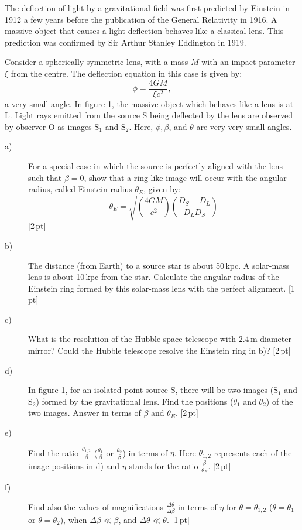 
The deflection of light by a gravitational field was first predicted by
Einstein in 1912 a few years before the publication of the General Relativity
in 1916. A massive object that causes a light deflection behaves like a
classical lens. This prediction was confirmed by Sir Arthur Stanley Eddington
in 1919.


Consider a spherically symmetric lens, with a mass $M$ with an impact
parameter $\xi$ from the centre. The deflection equation in this case is given
by:
\[ \phi = \frac{4GM}{\xi c^2}, \]
a very small angle. In figure 1, the massive object which behaves like a lens
is at L. Light rays emitted from the source S being deflected by the lens are
observed by observer O as images $\mathrm{S}_1$ and $\mathrm{S}_2$. Here,
$\phi, \beta$, and $\theta$ are very very small angles.

\begin{description}
\item[a)] For a special case in which the source is perfectly aligned with the
  lens such that $\beta = 0$, show that a ring-like image will occur with the
  angular radius, called Einstein radius $\theta_E$, given by:
  \[ \theta_E = \sqrt{\left(\frac{4GM}{c^2}\right)
     \left(\frac{D_S - D_L}{D_L D_S}\right)} \]
  \hfill[2\,pt]
\item[b)] The distance (from Earth) to a source star is about 50\,kpc. A
  solar-mass lens is about 10\,kpc from the star. Calculate the angular radius
  of the Einstein ring formed by this solar-mass lens with the perfect
  alignment. \hfill[1\,pt]
\item[c)] What is the resolution of the Hubble space telescope with 2.4\,m
  diameter mirror? Could the Hubble telescope resolve the Einstein ring in
  b)? \hfill[2\,pt]
\item[d)] In figure 1, for an isolated point source S, there will be two
  images ($\mathrm{S}_1$ and $\mathrm{S}_2$) formed by the gravitational
  lens. Find the positions ($\theta_1$ and $\theta_2$) of the two images.
  Answer in terms of $\beta$ and $\theta_E$. \hfill[2\,pt]
\item[e)] Find the ratio $\frac{\theta_{1,2}}{\beta}$ ($\frac{\theta_1}{\beta}$
  or $\frac{\theta_2}{\beta}$) in terms of $\eta$. Here $\theta_{1,2}$
  represents each of the image positions in d) and $\eta$ stands for the ratio
  $\frac{\beta}{\theta_E}$. \hfill[2\,pt]
\item[f)] Find also the values of magnifications
  $\frac{\Delta\theta}{\Delta\beta}$ in terms of $\eta$ for
  $\theta = \theta_{1,2}$ ($\theta = \theta_1$ or $\theta = \theta_2$), when
  $\Delta\beta \ll \beta$, and $\Delta\theta \ll \theta$. \hfill[1\,pt]
\end{description}
